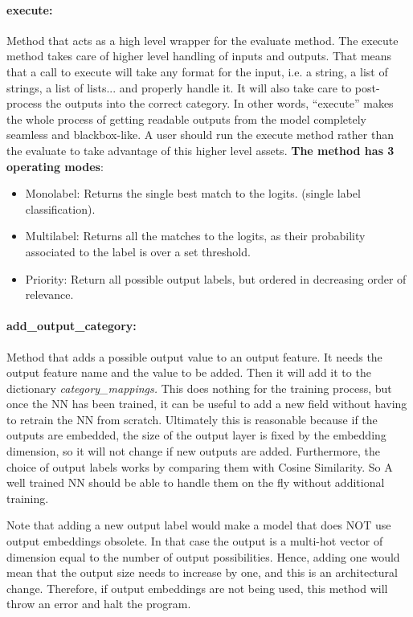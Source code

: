 \documentclass[a4paper, 11pt]{report}
\begin{document}
    \paragraph{execute:} Method that acts as a high level wrapper for the evaluate method.  The execute method takes care of higher level handling of inputs and outputs. That means that a call to execute will take any format for the input, i.e. a string, a list of strings, a list of lists... and properly handle it. It will also take care to post-process the outputs into the correct category. In other words, ``execute'' makes the whole process of getting readable outputs from the model completely seamless and blackbox-like. A user should run the execute method rather than the evaluate to take advantage of this higher level assets.\textbf{ The method has 3 operating modes}:

    \begin{itemize}
        \item Monolabel: Returns the single best match to the logits. (single label classification).
        \item Multilabel: Returns all the matches to the logits, as their probability associated to the label is over a set threshold.
        \item Priority: Return all possible output labels, but ordered in decreasing order of relevance.
    \end{itemize}

    \paragraph{add\_output\_category:} Method that adds a possible output value to an output feature. It needs the output feature name and the value to be added. Then it will add it to the dictionary \textit{category\_mappings.} This does nothing for the training process, but once the NN has been trained, it can be useful to add a new field without having to retrain the NN from scratch. Ultimately this is reasonable because if the outputs are embedded, the size of the output layer is fixed by the embedding dimension, so it will not change if new outputs are added. Furthermore, the choice of output labels works by comparing them with Cosine Similarity. So A well trained NN should be able to handle them on the fly without additional training.

    Note that adding a new output label would make a model that does NOT use output embeddings obsolete. In that case the output is a multi-hot vector of dimension equal to the number of output possibilities. Hence, adding one would mean that the output size needs to increase by one, and this is an architectural change. Therefore, if output embeddings are not being used, this method will throw an error and halt the program.
\end{document}
